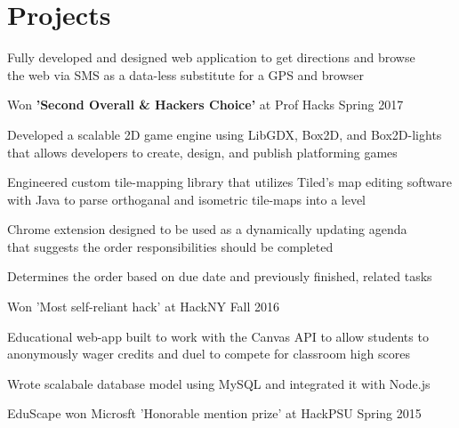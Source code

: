 \documentclass[]{deedy-resume-openfont}
\begin{document}
\begin{minipage}[t]{0.66\textwidth}
\section{Projects}

\begin{tightemize}
\item Fully developed and designed web application to get directions and browse \\the web via SMS as a data-less substitute for a GPS and browser
\item Won \textbf{'Second Overall \& Hackers Choice'} at Prof Hacks Spring 2017
\end{tightemize}
\sectionsep

\begin{tightemize}
\item Developed a scalable 2D game engine using LibGDX, Box2D, and Box2D-lights that allows developers to create, design, and publish platforming games
\item Engineered custom tile-mapping library that utilizes  Tiled's map editing software with Java to parse orthoganal and isometric tile-maps into a level   
\end{tightemize}
\sectionsep

\begin{tightemize}
\item Chrome extension designed to be used as a dynamically updating agenda \\that suggests the order responsibilities should be completed 
\item Determines the order based on due date and previously finished, related tasks 
\item Won 'Most self-reliant hack' at HackNY Fall 2016
\end{tightemize}
\sectionsep

\begin{tightemize}
\item Educational web-app built to work with the Canvas API to allow students to anonymously wager credits and duel to compete for classroom high scores
\item Wrote scalabale database model using MySQL and integrated it with Node.js 
\item EduScape won Microsft 'Honorable mention prize' at HackPSU Spring 2015
\end{tightemize}
\sectionsep

\end{minipage} 
\end{document}
